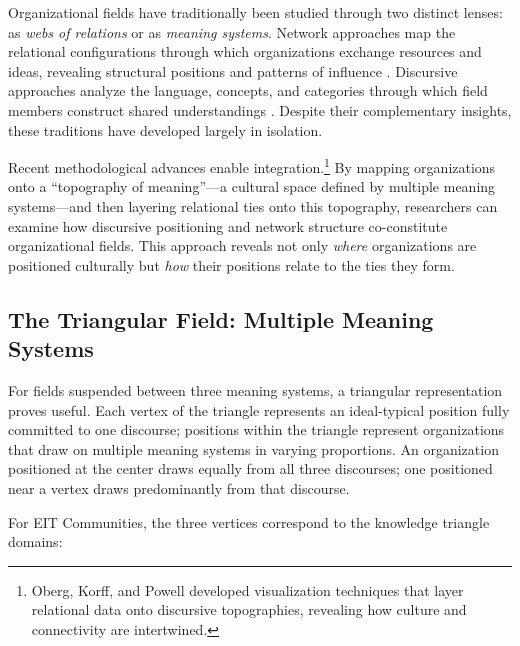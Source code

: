 \documentclass[../main.tex]{subfiles}
\begin{document}
Organizational fields have traditionally been studied through two distinct lenses: as \textit{webs of relations} or as \textit{meaning systems}. Network approaches map the relational configurations through which organizations exchange resources and ideas, revealing structural positions and patterns of influence \cite{powell2005network}. Discursive approaches analyze the language, concepts, and categories through which field members construct shared understandings \cite{phillips2004discourse}. Despite their complementary insights, these traditions have developed largely in isolation.

Recent methodological advances enable integration.\footnote{Oberg, Korff, and Powell \citeyear{oberg2017culture} developed visualization techniques that layer relational data onto discursive topographies, revealing how culture and connectivity are intertwined.} By mapping organizations onto a ``topography of meaning''---a cultural space defined by multiple meaning systems---and then layering relational ties onto this topography, researchers can examine how discursive positioning and network structure co-constitute organizational fields. This approach reveals not only \textit{where} organizations are positioned culturally but \textit{how} their positions relate to the ties they form.

\subsection{The Triangular Field: Multiple Meaning Systems}

For fields suspended between three meaning systems, a triangular representation proves useful. Each vertex of the triangle represents an ideal-typical position fully committed to one discourse; positions within the triangle represent organizations that draw on multiple meaning systems in varying proportions. An organization positioned at the center draws equally from all three discourses; one positioned near a vertex draws predominantly from that discourse.

For EIT Communities, the three vertices correspond to the knowledge triangle domains:
\end{document}

